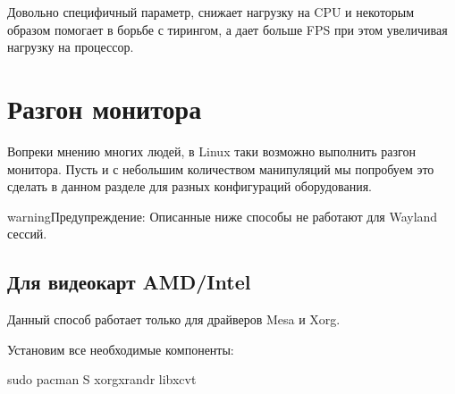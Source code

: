 \documentclass[letterpaper,10pt,russian,openany]{sphinxmanual}
\begin{document}
\sphinxAtStartPar
{}  \sphinxhyphen{} Довольно специфичный параметр,  \sphinxhyphen{} снижает нагрузку на CPU и некоторым образом помогает в борьбе с тирингом,
а  дает больше FPS при этом увеличивая нагрузку на процессор.

\ignorespaces 

\section{Разгон монитора }
\label{\detokenize{source/first-steps:monitor-overlocking}}\label{\detokenize{source/first-steps:index-11}}\label{\detokenize{source/first-steps:id11}}
\sphinxAtStartPar
Вопреки мнению многих людей, в Linux таки возможно выполнить разгон монитора.
Пусть и с небольшим количеством манипуляций мы попробуем это сделать в данном разделе
для разных конфигураций оборудования.

\begin{sphinxadmonition}{warning}{Предупреждение:}
\sphinxAtStartPar
Описанные ниже способы не работают для Wayland сессий.
\end{sphinxadmonition}

\ignorespaces 

\subsection{Для видеокарт AMD/Intel}
\label{\detokenize{source/first-steps:amd-intel}}\label{\detokenize{source/first-steps:monitor-overlocking-mesa}}\label{\detokenize{source/first-steps:index-12}}
\sphinxAtStartPar
Данный способ работает только для драйверов Mesa и Xorg.

\sphinxAtStartPar
Установим все необходимые компоненты:

\begin{sphinxVerbatim}[commandchars=\\\{\}]
sudo pacman \PYGZhy{}S xorg\PYGZhy{}xrandr libxcvt
\end{sphinxVerbatim}
\end{document}
